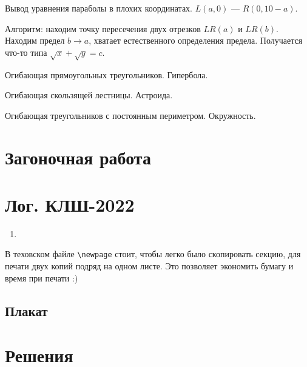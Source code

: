 \documentclass[12pt]{article}
\newcounter{problem}[section]
\theoremstyle{definition}
\begin{document}

Вывод уравнения параболы в плохих координатах. $L(a, 0)$ — $R(0, 10-a)$.

Алгоритм: находим точку пересечения двух отрезков $LR(a)$ и $LR(b)$. 
Находим предел $b\to a$, хватает естественного определения предела. Получается что-то типа 
$\sqrt x + \sqrt y = c$.


Огибающая прямоугольных треугольников. Гипербола.

Огибающая скользящей лестницы. Астроида.

Огибающая треугольников с постоянным периметром. Окружность.




\section{Загоночная работа}




\newpage

\section{Лог. КЛШ-2022}

\begin{enumerate}
  \item 
\end{enumerate}

В теховском файле \verb|\newpage| стоит, чтобы легко было скопировать секцию, для печати двух копий подряд на одном листе.
Это позволяет экономить бумагу и время при печати :)

\subsection{Плакат}






\renewenvironment{solution}[1]{%
         \vskip .5cm plus 2cm minus 0.1cm%
         {\bfseries \hyperlink{problem:#1}{#1.}}%
}%
{%
}%



\section{Решения}

\end{document}
